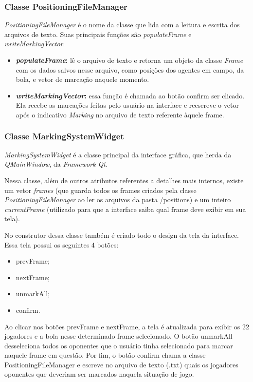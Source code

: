 \documentclass[a4paper,12pt]{article}
\begin{document}
\subsubsection{Classe PositioningFileManager}
\textit{PositioningFileManager} é o nome da classe que lida com a leitura e escrita dos arquivos de texto. Suas principais funções são \textit{populateFrame} e \textit{writeMarkingVector}.

\begin{itemize}
\item \textbf{\textit{populateFrame}:} lê o arquivo de texto e retorna um objeto da classe \textit{Frame} com os dados salvos nesse arquivo, como posições dos agentes em campo, da bola, e vetor de marcação naquele momento.

\item \textbf{\textit{writeMarkingVector}:} essa função é chamada ao botão confirm ser clicado. Ela recebe as marcações feitas pelo usuário na interface e reescreve o vetor após o indicativo \textit{Marking} no arquivo de texto referente àquele frame.
\end{itemize}

\subsubsection{Classe MarkingSystemWidget}
\textit{MarkingSystemWidget} é a classe principal da interface gráfica, que herda da \textit{QMainWindow}, da \textit{Framework Qt}.

Nessa classe, além de outros atributos referentes a detalhes mais internos, existe um vetor \textit{frames} (que guarda todos os frames criados pela classe \textit{PositioningFileManager} ao ler os arquivos da pasta /positions) e um inteiro \textit{currentFrame} (utilizado para que a interface saiba qual frame deve exibir em sua tela).

No construtor dessa classe também é criado todo o design da tela da interface. Essa tela possui os seguintes 4 botões:
\begin{itemize}
\item prevFrame;
\item nextFrame;
\item unmarkAll;
\item confirm.
\end{itemize}

Ao clicar nos botões prevFrame e nextFrame, a tela é atualizada para exibir os 22 jogadores e a bola nesse determinado frame selecionado. O botão unmarkAll desseleciona todos os oponentes que o usuário tinha selecionado para marcar naquele frame em questão. Por fim, o botão confirm chama a classe PositioningFileManager e escreve no arquivo de texto (.txt) quais os jogadores oponentes que deveriam ser marcados naquela situação de jogo.
\end{document}
